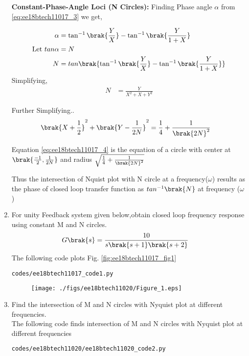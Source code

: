 \begin{enumerate}[label=\thesection.\arabic*.,ref=\thesection.\theenumi]
\textbf{Constant-Phase-Angle Loci (N Circles):}
Finding Phase angle $\alpha$ from \eqref{eq:ee18btech11017_3} we get,

\begin{align}
\alpha &= \tan^{-1}\brak{\frac{Y}{X}}-\tan^{-1}\brak{\frac{Y}{1+X}}
\\
\text{Let } tan\alpha &= N
\\
N &= tan\brak{\tan^{-1}\brak{\frac{Y}{X}}-\tan^{-1}\brak{\frac{Y}{1+X}}}
\end{align}
Simplifying,
\begin{align}
N &= \frac{Y}{X^{2}+X+Y^{2}}
\end{align}

Further Simplifying..
\begin{align}
\brak{X+\frac{1}{2}}^{2}+\brak{Y-\frac{1}{2N}}^{2} &= \frac{1}{4}+\frac{1}{\brak{2N}^{2}}
\label{eq:ee18btech11020_4}
\end{align}

Equation \eqref{eq:ee18btech11017_4} is the equation of a circle with center at $\brak{\frac{-1}{2},\frac{1}{2N}}$ and radius $\sqrt{\frac{1}{4}+\frac{1}{\brak{2N}^{2}}}$


Thus the intersection of Nquist plot with N circle at a frequency($\omega$) results as the phase of closed loop transfer function as $tan^{-1}\brak{N}$ at frequency ($\omega$)


\item
For unity Feedback system given below,obtain closed loop frequency response using constant M and N circles.
\begin{align}
G\brak{s} &=\frac{10}{s\brak{s+1}\brak{s+2}}
\end{align}
\solution 
The following code plots Fig. \ref{fig:ee18btech11017_fig1}
\begin{lstlisting}
codes/ee18btech11017_code1.py
\end{lstlisting}


\begin{figure}[!h]
  \texttt{[image: ./figs/ee18btech11020/Figure\_1.eps]}
 \caption{}
  \label{fig:ee18btech11020_fig1}
\end{figure}

\item
Find the intersection of M and N circles with Nyquist plot at different frequencies. \\
\solution 
The following code finds intersection of M and N circles with Nyquist plot at different frequencies
\begin{lstlisting}
codes/ee18btech11020/ee18btech11020_code2.py
\end{lstlisting}


\end{enumerate}
